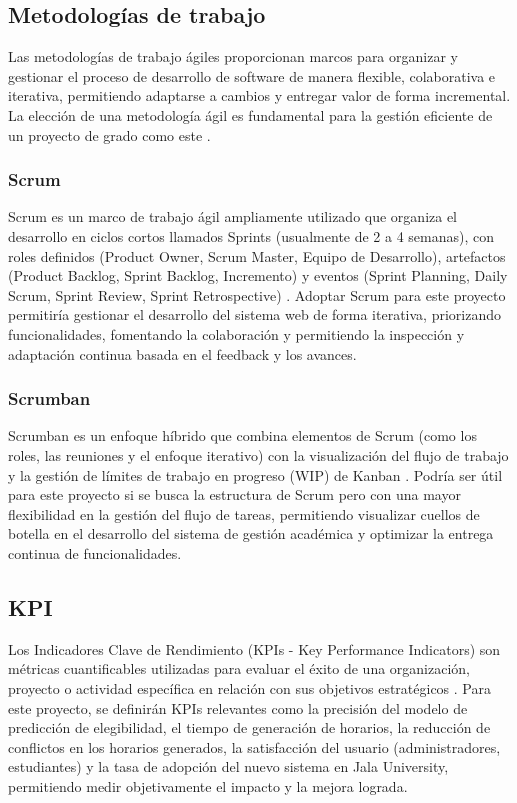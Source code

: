 \subsection{Metodologías de trabajo}
Las metodologías de trabajo ágiles proporcionan marcos para organizar y gestionar el proceso de desarrollo de software de manera flexible, colaborativa e iterativa, permitiendo adaptarse a cambios y entregar valor de forma incremental. La elección de una metodología ágil es fundamental para la gestión eficiente de un proyecto de grado como este \parencite{Beck2001}.

\subsubsection{Scrum}
Scrum es un marco de trabajo ágil ampliamente utilizado que organiza el desarrollo en ciclos cortos llamados Sprints (usualmente de 2 a 4 semanas), con roles definidos (Product Owner, Scrum Master, Equipo de Desarrollo), artefactos (Product Backlog, Sprint Backlog, Incremento) y eventos (Sprint Planning, Daily Scrum, Sprint Review, Sprint Retrospective) \parencite{SchwaberSutherland2020}. Adoptar Scrum para este proyecto permitiría gestionar el desarrollo del sistema web de forma iterativa, priorizando funcionalidades, fomentando la colaboración y permitiendo la inspección y adaptación continua basada en el feedback y los avances.

\subsubsection{Scrumban}
Scrumban es un enfoque híbrido que combina elementos de Scrum (como los roles, las reuniones y el enfoque iterativo) con la visualización del flujo de trabajo y la gestión de límites de trabajo en progreso (WIP) de Kanban \parencite{Kniberg2010}. Podría ser útil para este proyecto si se busca la estructura de Scrum pero con una mayor flexibilidad en la gestión del flujo de tareas, permitiendo visualizar cuellos de botella en el desarrollo del sistema de gestión académica y optimizar la entrega continua de funcionalidades.

\subsection{KPI}
Los Indicadores Clave de Rendimiento (KPIs - Key Performance Indicators) son métricas cuantificables utilizadas para evaluar el éxito de una organización, proyecto o actividad específica en relación con sus objetivos estratégicos \parencite{Parmenter2015}. Para este proyecto, se definirán KPIs relevantes como la precisión del modelo de predicción de elegibilidad, el tiempo de generación de horarios, la reducción de conflictos en los horarios generados, la satisfacción del usuario (administradores, estudiantes) y la tasa de adopción del nuevo sistema en Jala University, permitiendo medir objetivamente el impacto y la mejora lograda.

